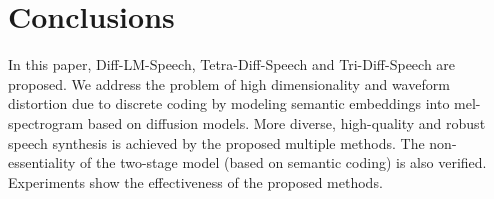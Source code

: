 \documentclass{article}
\begin{document}
\begin{table}[]
\captionsetup{skip=5pt} %
 \caption{MOS}
 \label{tab:mos}
 \centering
{}
\end{table}

\section{Conclusions}
In this paper, Diff-LM-Speech, Tetra-Diff-Speech and Tri-Diff-Speech are proposed. We address the problem of high dimensionality and waveform distortion due to discrete coding by modeling semantic embeddings into mel-spectrogram based on diffusion models. More diverse, high-quality and robust speech synthesis is achieved by the proposed multiple methods. The non-essentiality of the two-stage model (based on semantic coding) is also verified. Experiments show the effectiveness of the proposed methods. 

\vfill\pagebreak







\footnotesize

\end{document}
